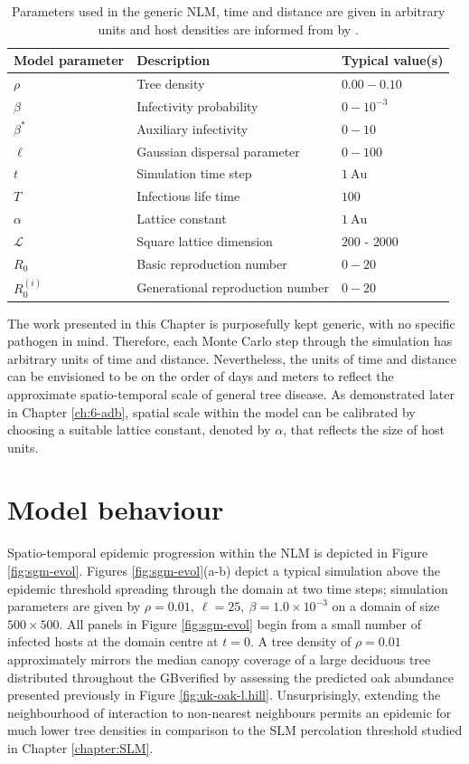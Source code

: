 \begin{table}
\centering
\begin{tabular}{l l l}
\hline
\textbf{Model parameter} & \textbf{Description} & \textbf{Typical value(s)}\\
\hline
$\rho$  & Tree density & $0.00 - 0.10$ \\ 
$\beta$ & Infectivity probability & $0 - 10^{-3}$ \\
$\beta^*$ & Auxiliary infectivity & $0 - 10$ \\
$\ell$ & Gaussian dispersal parameter & $ 0 - 100$ \\
$t$ & Simulation time step & $1\ \mathrm{Au}$\\
$T$ & Infectious life time & $100$  \\
$\alpha$ & Lattice constant & $1\ \mathrm{Au}$ \\
$\mathcal{L}$ & Square lattice dimension & $200$ - $2000$ \\
$R_0$ & Basic reproduction number & $0-20$ \\
$R_0^{(i)}$ & Generational reproduction number & $0-20$ \\
\hline
\end{tabular}
\caption{Parameters used in the generic NLM, time and distance are given in arbitrary units and host densities are informed from by \cite{hill.data}.}
\label{tab:SIR-model}
\end{table}

The work presented in this Chapter is purposefully kept generic, with no specific pathogen in mind.
Therefore, each Monte Carlo step through the simulation has arbitrary units of time and distance.
Nevertheless, the units of time and distance can be envisioned to be on the order of days and meters to reflect the approximate spatio-temporal scale of general tree disease.
As demonstrated later in Chapter \ref{ch:6-adb}, spatial scale within the model can be calibrated by choosing a suitable lattice constant, denoted by $\alpha$, that reflects the size of host units.

\section{Model behaviour}

Spatio-temporal epidemic progression within the NLM is depicted in Figure \ref{fig:sgm-evol}.
Figures \ref{fig:sgm-evol}(a-b) depict a typical simulation above the epidemic threshold spreading through the domain at two time steps;
simulation parameters are given by $\rho=0.01,\ \ell = 25,\ \beta = 1.0 \times 10^{-3}$ on a domain of size $500 \times 500$.
All panels in Figure \ref{fig:sgm-evol} begin from a small number of infected hosts at the domain centre at $t=0$.
A tree density of $\rho = 0.01$ approximately mirrors the median canopy coverage of a large deciduous tree distributed throughout the GB\textemdash verified by assessing the predicted oak abundance presented previously in Figure \ref{fig:uk-oak-l.hill}.
Unsurprisingly, extending the neighbourhood of interaction to non-nearest neighbours permits an epidemic for much lower tree densities in comparison to the SLM percolation threshold studied in Chapter \ref{chapter:SLM}.

